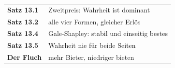 \begin{merksatz}
\begin{center}
\renewcommand{\arraystretch}{1.5}
\begin{tabular}{@{}P{3.0cm}P{5.6cm}@{}}
\toprule
\textbf{Satz 13.1} & Zweitpreis: Wahrheit ist dominant\\
\textbf{Satz 13.2} & alle vier Formen, gleicher Erlös\\
\textbf{Satz 13.4} & Gale-Shapley: stabil und einseitig bestes\\
\textbf{Satz 13.5} & Wahrheit nie für beide Seiten\\
\textbf{Der Fluch} & mehr Bieter, niedriger bieten\\
\bottomrule
\end{tabular}
\end{center}

\begin{center}
\begin{minipage}{0.88\textwidth}
\end{minipage}
\end{center}
\end{merksatz}
